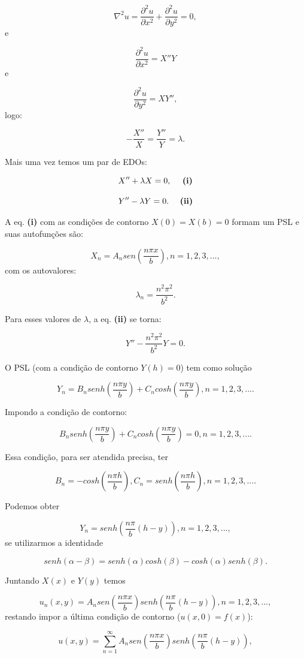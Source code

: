 \documentclass[a4paper,portuguese,9pt,final]{extarticle}
\providecommand{\sin}{} \renewcommand{\sin}{sen}
\begin{document}
\begin{multicols*}{2}
    $$\nabla^{2}u = \frac{\partial^2 u}{\partial x^2} + \frac{\partial^2 u}{\partial y^2} = 0,$$ e 

    $$\frac{\partial^2 u}{\partial x^2} = X''Y$$ e

    $$\frac{\partial^2 u}{\partial y^2} = XY'',$$ logo:

    $$-\frac{X''}{X} = \frac{Y''}{Y} = \lambda.$$
    
    Mais uma vez temos um par de EDOs:

    $$X'' + \lambda X = 0, \mbox{ \ \ \ \textbf{(i)}}$$ 

    $$Y'' - \lambda Y = 0. \mbox{ \ \ \ \textbf{(ii)}}$$

    A eq. \textbf{(i)} com as condições de contorno $X(0)=X(b)=0$ formam um PSL e suas autofunções são:

    $$X_n = A_n \sin{(\frac{n\pi x}{b})}, n = 1, 2, 3, ...,$$
com os autovalores:

    $$\lambda_n = \frac{n^2\pi^2}{b^2}.$$

    Para esses valores de $\lambda$, a eq. \textbf{(ii)} se torna:

    $$Y'' - \frac{n^2\pi^2}{b^2} Y = 0.$$

    O PSL (com a condição de contorno $Y(h) = 0$) tem como solução

    $$Y_n = B_n senh{(\frac{n\pi y}{b})} + C_n cosh{(\frac{n\pi y}{b})}, n = 1, 2, 3, ... .$$

    Impondo  a condição de contorno:

    $$B_n senh{(\frac{n\pi y}{b})} + C_n cosh{(\frac{n\pi y}{b})} = 0, n = 1, 2, 3, ... .$$


    Essa condição, para ser atendida precisa, ter

    $$B_n =  -cosh{(\frac{n\pi h}{b})}, C_n = senh{(\frac{n\pi h}{b})}, n = 1, 2, 3, ... .$$


    Podemos obter

    $$Y_n = senh{(\frac{n\pi}{b} (h-y))}, n = 1, 2, 3, ... ,$$
se utilizarmos a identidade

    $$senh(\alpha - \beta) = senh(\alpha)cosh(\beta) - cosh(\alpha)senh(\beta).$$

    Juntando $X(x)$ e $Y(y)$ temos

    $$u_n (x,y) = A_n \sin{(\frac{n\pi x}{b})}senh{(\frac{n\pi}{b} (h-y))}, n = 1, 2, 3, ... ,$$
    restando impor a última condição de contorno ($u(x,0)=f(x)$):

    $$u(x,y) = \sum_{n=1}^{\infty} A_n \sin{(\frac{n\pi x}{b})}senh{(\frac{n\pi}{b} (h-y))},$$


\end{multicols*}
\end{document}
